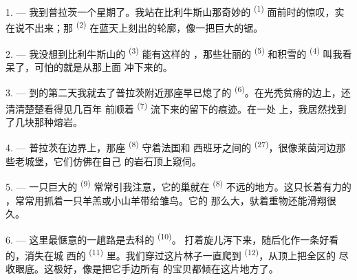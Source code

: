 
\VUsaut{4.0mm}
\VUsaut{3.0mm}

\VUsaut{3.0mm}

\VUsaut{3.0mm}

1. --- 我到普拉茨一个星期了。我站在比利牛斯山那奇妙的
\textsuperscript{(1)} 面前时的惊叹，实在说不出来；那 \textsuperscript{(2)}
在蓝天上刻出的轮廓，像一把巨大的锯。

2. --- 我没想到比利牛斯山的 \textsuperscript{(3)} 能有这样的
，那些壮丽的 \textsuperscript{(5)} 和积雪的
 \textsuperscript{(4)} 叫我看呆了，可怕的就是从那上面
冲下来的。

\VUsaut{3.0mm}
\VUsaut{3.0mm}

3. --- 到的第二天我就去了普拉茨附近那座早已熄了的
\textsuperscript{(6)}。在光秃贫瘠的边上，还清清楚楚看得见几百年
前顺着 \textsuperscript{(7)} 流下来的留下的痕迹。在一处
上，我居然找到了几块那种熔岩。

4. --- 普拉茨在边界上，那座 \textsuperscript{(8)} 守着法国和
西班牙之间的 \textsuperscript{(27)}，很像莱茵河边那些老城堡，它们仿佛在自己
的岩石顶上窥伺。

5. --- 一只巨大的 \textsuperscript{(9)} 常常引我注意，它的巢就在
 \textsuperscript{(8)} 不远的地方。这只长着有力的
，常常用抓着一只羊羔或小山羊带给雏鸟。它的
那么大，驮着重物还能滑翔很久。

\VUsaut{3.0mm}
\VUsaut{3.0mm}

6. --- 这里最惬意的一趟路是去科的 \textsuperscript{(10)}。
打着旋儿泻下来，随后化作一条好看的，消失在城
西的 \textsuperscript{(11)} 里。我们穿过这片林子一直爬到
 \textsuperscript{(12)}，从顶上把全区的
尽收眼底。这极好，像是把它手边所有
的宝贝都倾在这片地方了。

